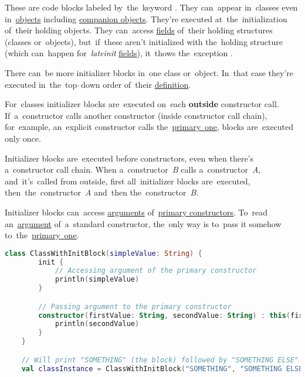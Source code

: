 \label{kotlininitblock}
These are code blocks labeled by~the~keyword .
They can~appear in~classes even in~\hyperref[kotlinobject]{objects} including \hyperref[companionobject]{companion objects}.
They're executed at~the~initialization of~their holding objects.
They can~access \hyperref[variablefieldproperty]{fields} of~their holding structures (classes or~objects), but~if~these aren't initialized with the~holding structure (which can~happen for~\textit{lateinit} \hyperref[variablefieldproperty]{fields}), it~thows the~exception .

There can~be more initializer blocks in~one class or~object.
In~that case they're executed in~the~top--down order of~their \hyperref[declarationdefinition]{definition}.

For~classes initializer blocks are~executed on~each \textbf{outside} constructor call.
If~a~constructor calls another constructor (inside constructor call chain), for~example, an~explicit constructor calls the~\hyperref[kotlinprimaryconstructor]{primary~one}, blocks are~executed only once.

Initializer blocks are~executed before constructors, even when there's a~constructor call chain.
When a~constructor~\textit{B} calls a~constructor~\textit{A}, and~it's~called from outside, first all~initializer blocks are~executed, then~the~constructor~\textit{A} and~then the~constructor~\textit{B}.

Initializer blocks can~access \hyperref[parameterargument]{arguments} of~\hyperref[kotlinprimaryconstructor]{primary constructors}.
To~read an~\hyperref[parameterargument]{argument} of~a~standard constructor, the~only way is to~pass it somehow to~the~\hyperref[kotlinprimaryconstructor]{primary~one}.

\begin{lstlisting}[language=Kotlin]
    class ClassWithInitBlock(simpleValue: String) {
        init {
            // Accessing argument of the primary constructor
            println(simpleValue)
        }

        // Passing argument to the primary constructor
        constructor(firstValue: String, secondValue: String) : this(firstValue) {
            println(secondValue)
        }
    }

    // Will print "SOMETHING" (the block) followed by "SOMETHING ELSE" (the constructor)
    val classInstance = ClassWithInitBlock("SOMETHING", "SOMETHING ELSE")
\end{lstlisting}

